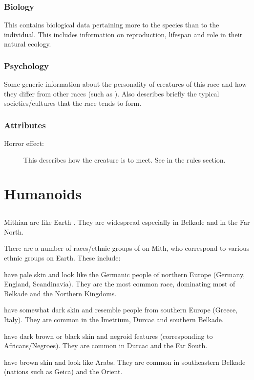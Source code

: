 \subsubsection{Biology}
This contains biological data pertaining more to the species than to the individual. This includes information on reproduction, lifespan and role in their natural ecology. 

\subsubsection{Psychology}
Some generic information about the personality of creatures of this race and how they differ from other races (such as \humans). Also describes briefly the typical societies/cultures that the race tends to form. 

\subsubsection{Attributes}
\begin{description}
	\item[Horror effect:] This describes how  the creature is to meet. See  in the rules section. 
\end{description}





\newpage
\section{Humanoids}

\subsection{\Human{}}
\label{Human}
Mithian \humans{} are like Earth \humans{}. They are widespread especially in Belkade and in the Far North. 

There are a number of races/ethnic groups of \humans{} on Mith, who correspond to various ethnic groups on Earth. These include: 

\bd
  \item[\introi{Belkadians}{Belkadians (race of \humans{})}] have pale skin and look like the Germanic people of northern Europe (Germany, England, Scandinavia). They are the most common \human{} race, dominating most of Belkade and the Northern Kingdoms. 
  \item[\introi{Fraens}{Fraens (race of \humans{}}] have somewhat dark skin and resemble people from southern Europe (Greece, Italy). They are common in the Imetrium, Durcac and southern Belkade. 
  \item[\introi{Kohons}{Kohons (race of \humans{})}] have dark brown or black skin and negroid features (corresponding to Africans/Negroes). They are common in Durcac and the Far South. 
  \item[\introi{Hoyds}{Hoyds (race of \humans{})}] have brown skin and look like Arabs. They are common in southeastern Belkade (nations such as Geica) and the Orient. 
\ed

